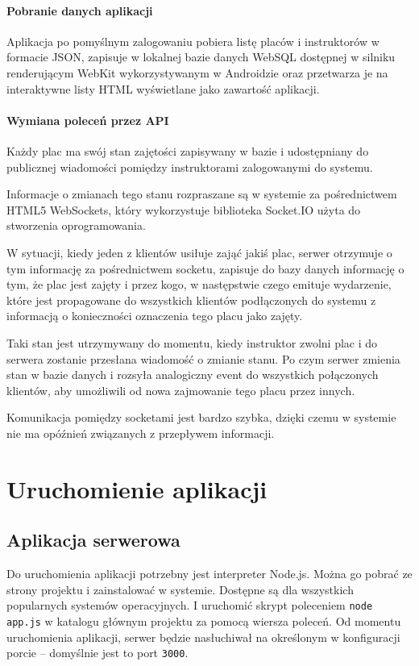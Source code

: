 \documentclass[twoside,a4paper,openright,12pt]{book}
\begin{document}
\subsubsection*{Pobranie danych aplikacji}
Aplikacja po pomyślnym zalogowaniu pobiera listę placów i instruktorów w formacie JSON, zapisuje w lokalnej bazie danych WebSQL dostępnej w silniku renderującym WebKit wykorzystywanym w Androidzie oraz przetwarza je na interaktywne listy HTML wyświetlane jako zawartość aplikacji.

\subsubsection*{Wymiana poleceń przez API}
Każdy plac ma swój stan zajętości zapisywany w bazie i udostępniany do publicznej wiadomości pomiędzy instruktorami zalogowanymi do systemu.

Informacje o zmianach tego stanu rozpraszane są w systemie za pośrednictwem HTML5 WebSockets, który wykorzystuje biblioteka Socket.IO użyta do stworzenia oprogramowania.

W sytuacji, kiedy jeden z klientów usiłuje zająć jakiś plac, serwer otrzymuje o tym informację za pośrednictwem socketu, zapisuje do bazy danych informację o tym, że plac jest zajęty i przez kogo, w następstwie czego emituje wydarzenie, które jest propagowane do wszystkich klientów podłączonych do systemu z informacją o konieczności oznaczenia tego placu jako zajęty.

Taki stan jest utrzymywany do momentu, kiedy instruktor zwolni plac i do serwera zostanie przesłana wiadomość o zmianie stanu. Po czym serwer zmienia stan w bazie danych i rozsyła analogiczny event do wszystkich połączonych klientów, aby umożliwili od nowa zajmowanie tego placu przez innych.

Komunikacja pomiędzy socketami jest bardzo szybka, dzięki czemu w systemie nie ma opóźnień związanych z przepływem informacji.


\chapter{Uruchomienie aplikacji}

\section{Aplikacja serwerowa}

Do uruchomienia aplikacji potrzebny jest interpreter Node.js. Można go pobrać ze strony projektu i zainstalować w systemie. Dostępne są dla wszystkich popularnych systemów operacyjnych. I uruchomić skrypt poleceniem \texttt{node app.js} w katalogu głównym projektu za pomocą wiersza poleceń.
Od momentu uruchomienia aplikacji, serwer będzie nasłuchiwał na określonym w konfiguracji porcie -- domyślnie jest to port \texttt{3000}.
\end{document}
